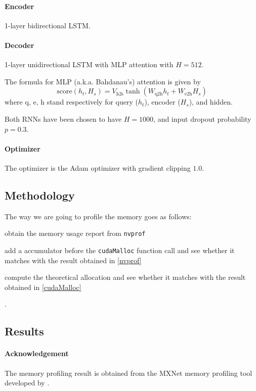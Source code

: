 \documentclass{article}
\begin{document}
\paragraph{Encoder}
1-layer bidirectional LSTM.

\paragraph{Decoder}
1-layer unidirectional LSTM with MLP attention with \(H=512\).

\begin{tcolorbox}
  The formula for MLP (a.k.a. Bahdanau's) attention is given by 
  \[\text{score}(h_t, H_s)=V_\text{h2s}\tanh(W_\text{q2h}h_t+W_\text{e2h}H_s)\]
  where \(\text{q, e, h}\) stand respectively for query (\(h_t\)), encoder (\(H_s\)), and hidden.
\end{tcolorbox}

Both RNNs have been chosen to have \(H=1000\), and input dropout probability \(p=0.3\).

\paragraph{Optimizer}
The optimizer is the Adam optimizer with gradient clipping \(1.0\).

\subsection{Methodology}

The way we are going to profile the memory goes as follows:
\begin{enumerate*}[(1)]
  \item obtain the memory usage report from \lstinline{nvprof}
  \label{nvprof}
  \item add a accumulator before the \lstinline{cudaMalloc} function call and 
  see whether it matches with the result obtained in \ref{nvprof}
  \label{cudaMalloc}
  \item compute the theoretical allocation and 
  see whether it matches with the result obtained in \ref{cudaMalloc}
\end{enumerate*}.

\subsection{Results}

\paragraph{Acknowledgement}
The memory profiling result is obtained from the MXNet memory profiling tool developed by .
\end{document}
